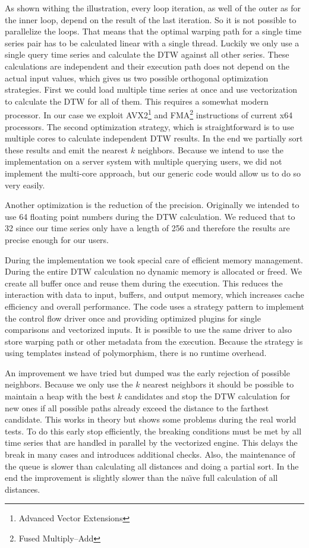 As shown withing the illustration, every loop iteration, as well of the outer as for the inner loop, depend on the result of the last iteration. So it is not possible to parallelize the loops. That means that the optimal warping path for a single time series pair has to be calculated linear with a single thread. Luckily we only use a single query time series and calculate the DTW against all other series. These calculations are independent and their execution path does not depend on the actual input values, which gives us two possible orthogonal optimization strategies. First we could load multiple time series at once and use vectorization to calculate the DTW for all of them. This requires a somewhat modern processor. In our case we exploit AVX2\footnote{Advanced Vector Extensions} and FMA\footnote{Fused Multiply–Add} instructions of current x64 processors. The second optimization strategy, which is straightforward is to use multiple cores to calculate independent DTW results. In the end we partially sort these results and emit the nearest $k$ neighbors. Because we intend to use the implementation on a server system with multiple querying users, we did not implement the multi-core approach, but our generic code would allow us to do so very easily.

Another optimization is the reduction of the precision. Originally we intended to use \SI{64}{\bit} floating point numbers during the DTW calculation. We reduced that to \SI{32}{\bit} since our time series only have a length of \num{256} and therefore the results are precise enough for our users.

During the implementation we took special care of efficient memory management. During the entire DTW calculation no dynamic memory is allocated or freed. We create all buffer once and reuse them during the execution. This reduces the interaction with data to input, buffers, and output memory, which increases cache efficiency and overall performance. The code uses a strategy pattern to implement the control flow driver once and providing optimized plugins for single comparisons and vectorized inputs. It is possible to use the same driver to also store warping path or other metadata from the execution. Because the strategy is using templates instead of polymorphism, there is no runtime overhead.

An improvement we have tried but dumped was the early rejection of possible neighbors. Because we only use the $k$ nearest neighbors it should be possible to maintain a heap with the best $k$ candidates and stop the DTW calculation for new ones if all possible paths already exceed the distance to the farthest candidate. This works in theory but shows some problems during the real world tests. To do this early stop efficiently, the breaking conditions must be met by all time series that are handled in parallel by the vectorized engine. This delays the break in many cases and introduces additional checks. Also, the maintenance of the queue is slower than calculating all distances and doing a partial sort. In the end the improvement is slightly slower than the na{\"\i}ve full calculation of all distances.




